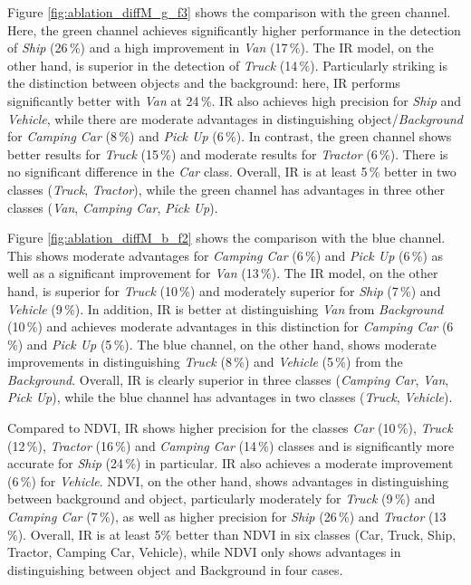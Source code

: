 Figure \ref{fig:ablation_diffM_g_f3} shows the comparison with the green channel. Here, the green channel achieves significantly higher performance in the detection of \textit{Ship} (26\,\%) and a high improvement in \textit{Van} (17\,\%). The IR model, on the other hand, is superior in the detection of \textit{Truck} (14\,\%). Particularly striking is the distinction between objects and the background: here, IR performs significantly better with \textit{Van} at 24\,\%. IR also achieves high precision for \textit{Ship} and \textit{Vehicle}, while there are moderate advantages in distinguishing object/\textit{Background} for \textit{Camping Car} (8\,\%) and \textit{Pick Up} (6\,\%). In contrast, the green channel shows better results for \textit{Truck} (15\,\%) and moderate results for \textit{Tractor} (6\,\%). There is no significant difference in the \textit{Car} class. Overall, IR is at least 5\,\% better in two classes (\textit{Truck}, \textit{Tractor}), while the green channel has advantages in three other classes (\textit{Van}, \textit{Camping Car}, \textit{Pick Up}).

Figure \ref{fig:ablation_diffM_b_f2} shows the comparison with the blue channel. This shows moderate advantages for \textit{Camping Car} (6\,\%) and \textit{Pick Up} (6\,\%) as well as a significant improvement for \textit{Van} (13\,\%). The IR model, on the other hand, is superior for \textit{Truck} (10\,\%) and moderately superior for \textit{Ship} (7\,\%) and \textit{Vehicle} (9\,\%). In addition, IR is better at distinguishing \textit{Van} from \textit{Background} (10\,\%) and achieves moderate advantages in this distinction for \textit{Camping Car} (6\,\%) and \textit{Pick Up} (5\,\%). The blue channel, on the other hand, shows moderate improvements in distinguishing \textit{Truck} (8\,\%) and \textit{Vehicle} (5\,\%) from the \textit{Background}. Overall, IR is clearly superior in three classes (\textit{Camping Car}, \textit{Van}, \textit{Pick Up}), while the blue channel has advantages in two classes (\textit{Truck}, \textit{Vehicle}).  

Compared to NDVI, IR shows higher precision for the classes \textit{Car} (10\,\%), \textit{Truck} (12\,\%), \textit{Tractor} (16\,\%) and \textit{Camping Car} (14\,\%) classes and is significantly more accurate for \textit{Ship} (24\,\%) in particular. IR also achieves a moderate improvement (6\,\%) for \textit{Vehicle}. NDVI, on the other hand, shows advantages in distinguishing between background and object, particularly moderately for \textit{Truck} (9\,\%) and \textit{Camping Car} (7\,\%), as well as higher precision for \textit{Ship} (26\,\%) and \textit{Tractor} (13\,\%). Overall, IR is at least 5\% better than NDVI in six classes (Car, Truck, Ship, Tractor, Camping Car, Vehicle), while NDVI only shows advantages in distinguishing between object and Background in four cases. 

